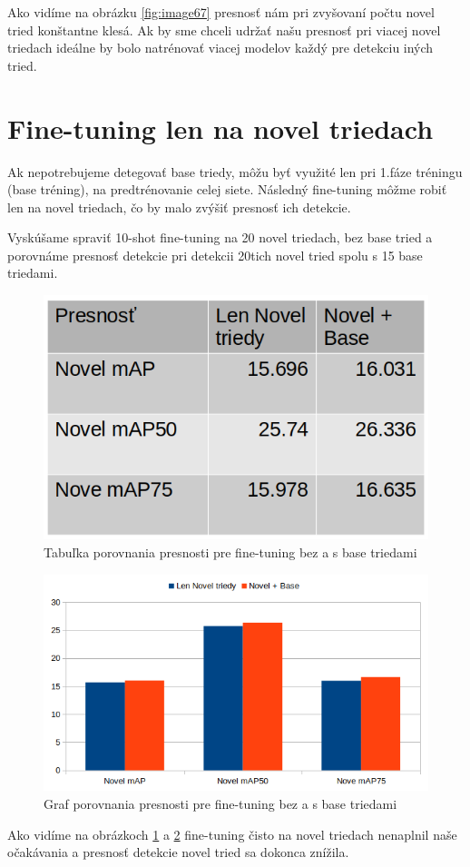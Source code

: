Ako vidíme na obrázku \ref{fig:image67} presnosť nám pri zvyšovaní počtu novel tried konštantne klesá. Ak by sme chceli udržať našu presnosť pri viacej novel triedach ideálne by bolo natrénovať viacej modelov každý pre detekciu iných tried. 

\section{Fine-tuning len na novel triedach}

Ak nepotrebujeme detegovať base triedy, môžu byť využité len pri 1.fáze tréningu (base tréning), na predtrénovanie celej siete. Následný fine-tuning môžme robiť len na novel triedach, čo by malo zvýšiť presnosť ich detekcie.

Vyskúšame spraviť 10-shot fine-tuning na 20 novel triedach, bez base tried a porovnáme presnosť detekcie pri detekcii 20tich novel tried spolu s 15 base triedami. 

\begin{figure}[H]
\centering
\includegraphics[width=\textwidth]{images/only_novel_compare_table.png}
\caption{Tabuľka porovnania presnosti pre fine-tuning bez a s base triedami}
\label{fig:image68}
\end{figure}

\begin{figure}[H]
\centering
\includegraphics[width=\textwidth]{images/only_novel_compare_chart.png}
\caption{Graf porovnania presnosti pre fine-tuning bez a s base triedami}
\label{fig:image69}
\end{figure}

Ako vidíme na obrázkoch \ref{fig:image68} a \ref{fig:image69} fine-tuning čisto na novel triedach nenaplnil naše očakávania a presnosť detekcie novel tried sa dokonca znížila. 

